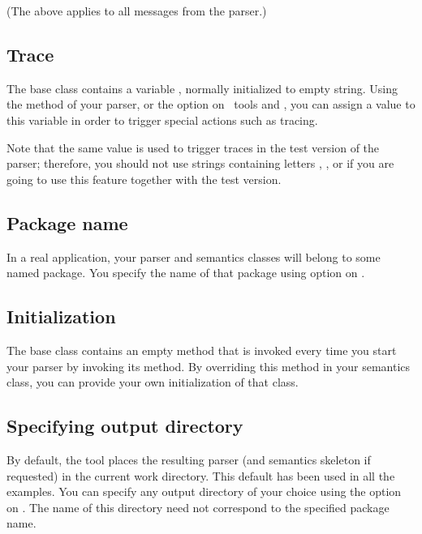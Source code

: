 (The above applies to all messages from the parser.)


\subsection{Trace}

The base class  contains a  variable
, normally initialized to empty string.
Using the method  of your parser, 
or the option  on \Mouse\ tools  and ,
you can assign a value to this variable in order to trigger special actions
such as tracing.

Note that the same value is used to trigger traces in the test version
of the parser; therefore, you should not use strings containing 
letters , , or  if you are going to use this feature
together with the test version.


\subsection{Package name}

In a real application, your parser and semantics classes will belong to some
named package.
You specify the name of that package using option  on 
.

\subsection{Initialization}

The base class  contains an empty method
 that is invoked every time you start your parser
by invoking its  method.
By overriding this method in your semantics class,
you can provide your own initialization of that class.


\subsection{Specifying output directory}

By default, the  tool places the resulting parser
(and semantics skeleton if requested) in the current work directory.
This default has been used in all the examples.
You can specify any output directory of your choice using the 
option on .
The name of this directory need not correspond to the specified package name.


